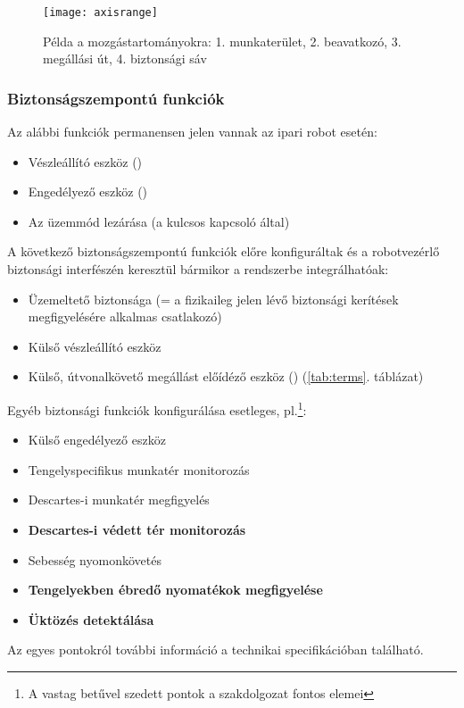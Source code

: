 \documentclass[../documentation.tex]{subfiles}
\begin{document}
\begin{figure}[H]
\centering
\texttt{[image: axisrange]}
\caption{Példa a mozgástartományokra: 1. munkaterület, 2. beavatkozó, 3. megállási út, 4. biztonsági sáv}
\label{fig:axisrange}
\end{figure}

\subsubsection{Biztonságszempontú funkciók}
Az alábbi funkciók permanensen jelen vannak az ipari robot esetén:
\begin{itemize}
	\item Vészleállító eszköz ()
	\item Engedélyező eszköz ()
	\item Az üzemmód lezárása (a kulcsos kapcsoló által)
\end{itemize}
A következő biztonságszempontú funkciók előre konfiguráltak és a robotvezérlő biztonsági interfészén keresztül bármikor a rendszerbe integrálhatóak:
\begin{itemize}
	\item Üzemeltető biztonsága (= a fizikaileg jelen lévő biztonsági kerítések megfigyelésére alkalmas csatlakozó)
	\item Külső vészleállító eszköz
	\item Külső, útvonalkövető megállást előídéző eszköz () (\ref{tab:terms}. táblázat)
\end{itemize}
Egyéb biztonsági funkciók konfigurálása esetleges, pl.\footnote{A vastag betűvel szedett pontok a szakdolgozat fontos elemei}:
\begin{itemize}
	\item Külső engedélyező eszköz
	\item Tengelyspecifikus munkatér monitorozás
	\item Descartes-i munkatér megfigyelés
	\item \textbf{Descartes-i védett tér monitorozás}
	\item Sebesség nyomonkövetés
	\item \textbf{Tengelyekben ébredő nyomatékok megfigyelése}
	\item \textbf{Üktözés detektálása}
\end{itemize}
Az egyes pontokról további információ a technikai specifikációban található\cite{sunrisemanual}.
\end{document}

